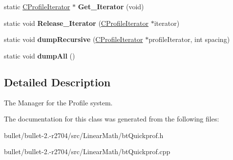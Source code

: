 \begin{DoxyCompactItemize}
\item 
\hypertarget{class_c_profile_manager_adb73d94f650fc4930daa8b4cb5b474a9}{static \hyperlink{class_c_profile_iterator}{C\+Profile\+Iterator} $\ast$ {\bfseries Get\+\_\+\+Iterator} (void)}\label{class_c_profile_manager_adb73d94f650fc4930daa8b4cb5b474a9}

\item 
\hypertarget{class_c_profile_manager_a3edb7249c6f2bdb8a204692c81643d85}{static void {\bfseries Release\+\_\+\+Iterator} (\hyperlink{class_c_profile_iterator}{C\+Profile\+Iterator} $\ast$iterator)}\label{class_c_profile_manager_a3edb7249c6f2bdb8a204692c81643d85}

\item 
\hypertarget{class_c_profile_manager_a9c8f2f632c668890d4dc38ef2f4ec9e2}{static void {\bfseries dump\+Recursive} (\hyperlink{class_c_profile_iterator}{C\+Profile\+Iterator} $\ast$profile\+Iterator, int spacing)}\label{class_c_profile_manager_a9c8f2f632c668890d4dc38ef2f4ec9e2}

\item 
\hypertarget{class_c_profile_manager_a24e1f0e68d3f0514d84488867acf8081}{static void {\bfseries dump\+All} ()}\label{class_c_profile_manager_a24e1f0e68d3f0514d84488867acf8081}

\end{DoxyCompactItemize}


\subsection{Detailed Description}
The Manager for the Profile system. 

The documentation for this class was generated from the following files\+:\begin{DoxyCompactItemize}
\item 
bullet/bullet-\/2.-\/r2704/src/\+Linear\+Math/bt\+Quickprof.\+h\item 
bullet/bullet-\/2.-\/r2704/src/\+Linear\+Math/bt\+Quickprof.\+cpp\end{DoxyCompactItemize}
